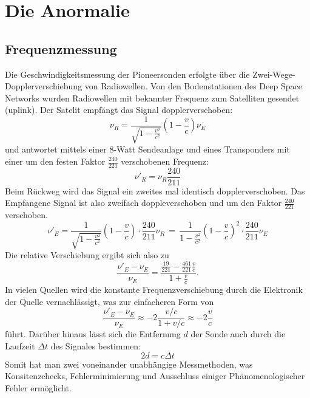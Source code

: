\documentclass[a4paper,10pt]{article}
\begin{document}
\section{Die Anormalie}
\subsection{Frequenzmessung}

Die Geschwindigkeitsmessung der Pioneersonden erfolgte über die Zwei-Wege-Dopplerverschiebung von Radiowellen.
Von den Bodenstationen des Deep Space Networks wurden Radiowellen mit bekannter Frequenz zum Satelliten gesendet (uplink).
Der Satelit empfängt das Signal dopplerverschoben:
\begin{equation}
 \nu_R = \frac{1}{\sqrt{1-\frac{v^2}{c^2}}}(1-\frac{v}{c})\nu_E
\end{equation}
und antwortet mittels einer 8-Watt Sendeanlage und eines Transponders
mit einer um den festen Faktor $ \frac{240}{221} $ verschobenen Frequenz:
\begin{equation}
\nu'_R = \nu_R\frac{240}{211}
\end{equation}
Beim Rückweg wird das Signal ein zweites mal identisch dopplerverschoben.
Das Empfangene Signal ist also zweifach doppleverschoben und um den Faktor $\frac{240}{221}$ verschoben.
\begin{equation}
 \nu'_E = \frac{1}{\sqrt{1-\frac{v^2}{c^2}}}(1-\frac{v}{c}) \cdot \frac{240}{211}\nu_R \, = \, \frac{1}{1-\frac{v^2}{c^2}}(1-\frac{v}{c})^2 \cdot \frac{240}{211} \nu_E
\end{equation}
Die relative Verschiebung ergibt sich also zu
\begin{equation}
 \frac{\nu'_E-\nu_E}{\nu_E} = \frac{\frac{19}{221}- \frac{461}{221}\frac{v}{c}}{1+\frac{v}{c}}.
\end{equation}
In vielen Quellen wird die konstante Frequenzverschiebung durch die Elektronik der Quelle vernachlässigt, was zur einfacheren Form von
\begin{equation}
 \frac{\nu'_E-\nu_E}{\nu_E} \approx -2\frac{v/c}{1+v/c} \approx -2 \frac{v}{c}
\end{equation}
führt.
Darüber hinaus lässt sich die Entfernung $d$ der Sonde auch durch die Laufzeit $\Delta t$ des Signales bestimmen:
\begin{equation}
 2d = c \Delta t
\end{equation}
Somit hat man zwei voneinander unabhängige Messmethoden, was Konsitenzchecks,
Fehlerminimierung und Ausschluss einiger Phänomenologischer Fehler ermöglicht.
\end{document}
